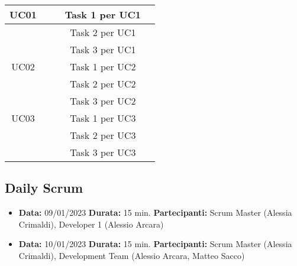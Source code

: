 \documentclass{article}
\begin{document}
\begin{itemize}
\begin{tabular}{ |c|c|c|c|c| }
            \hline
            UC01           &                     &               &   Task 1 per UC1   &               \\
            \hline
                           &                     &               &   Task 2 per UC1   &               \\
            \hline
                           &                     &               &   Task 3 per UC1   &               \\
            \hline
            UC02           &                     &               &   Task 1 per UC2   &               \\
            \hline
                           &                     &               &   Task 2 per UC2   &               \\
            \hline
                           &                     &               &   Task 3 per UC2   &               \\
            \hline
            UC03           &                     &               &   Task 1 per UC3   &               \\
            \hline
                           &                     &               &   Task 2 per UC3   &               \\
            \hline
                           &                     &               &   Task 3 per UC3   &               \\
            \hline
        \end{tabular}
    \end{itemize}

    \subsection{Daily Scrum}
    \begin{itemize}
        \item \textbf{Data:} 09/01/2023
        \newline \textbf{Durata:} 15 min.
        \newline \textbf{Partecipanti:} Scrum Master (Alessia Crimaldi), Developer 1 (Alessio Arcara)
    \end{itemize}
    \begin{itemize}
        \item \textbf{Data:} 10/01/2023
        \newline \textbf{Durata:} 15 min.
        \newline \textbf{Partecipanti:} Scrum Master (Alessia Crimaldi), Development Team (Alessio Arcara, Matteo Sacco)
    \end{itemize}
\end{document}
